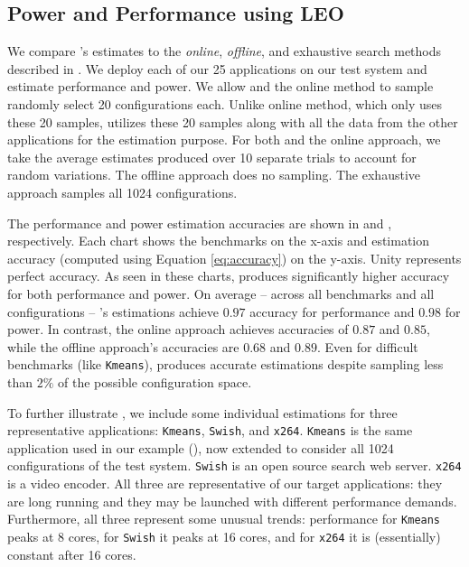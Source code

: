 \subsection{Power and Performance using LEO}
\label{sec:experiment:PP}
We compare \SYSTEM{}'s estimates to the \emph{online}, \emph{offline},
and exhaustive search methods described in .  We deploy each of our 25 applications on our test
system and estimate performance and power.  We allow \SYSTEM{} and the
online method to sample randomly select 20 configurations each. Unlike online method, which only uses these 20 samples, \SYSTEM{} utilizes these 20 samples along with all the data from the other applications for the estimation purpose.  For
both \SYSTEM{} and the online approach, we take the average estimates
produced over 10 separate trials to account for random variations.
The offline approach does no sampling.  The exhaustive approach
samples all 1024 configurations.

The performance and power estimation accuracies are shown in
 and , respectively.  Each
chart shows the benchmarks on the x-axis and estimation accuracy
(computed using Equation \ref{eq:accuracy}) on the y-axis.  Unity
represents perfect accuracy.  As seen in these charts, \SYSTEM{}
produces significantly higher accuracy for both performance and power.
On average -- across all benchmarks and all configurations --
\SYSTEM{}'s estimations achieve $0.97$ accuracy for performance and
$0.98$ for power.  In contrast, the online approach achieves
accuracies of $0.87$ and $0.85$, while the offline approach's
accuracies are $0.68$ and $0.89$.  Even for difficult benchmarks (like
\texttt{Kmeans}), \SYSTEM{} produces accurate estimations despite
sampling less than $2\%$ of the possible configuration space.

To further illustrate \SYSTEM{}, we include some individual
estimations for three representative applications: \texttt{Kmeans},
\texttt{Swish}, and \texttt{x264}.  \texttt{Kmeans} is the same
application used in our example (), now extended to
consider all 1024 configurations of the test system.  \texttt{Swish}
is an open source search web server. \texttt{x264} is a video encoder.
All three are representative of our target applications: they are long
running and they may be launched with different performance demands.
Furthermore, all three represent some unusual trends: performance for
\texttt{Kmeans} peaks at 8 cores, for \texttt{Swish} it peaks at 16
cores, and for \texttt{x264} it is (essentially) constant after 16
cores.

